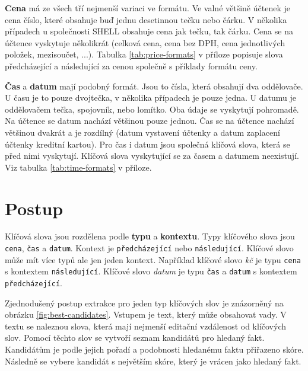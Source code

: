 \documentclass[thesis=B,czech]{FITthesis}[2019/12/23]
\def\myit#1{\texttt{#1}}
\def\pred{\texttt{předcházející}}
\def\po{\texttt{následující}}
\begin{document}
\textbf{Cena} má ze všech tří nejmenší variaci ve formátu. Ve valné většině účtenek je cena číslo, které obsahuje buď jednu desetinnou tečku nebo čárku. V několika případech u společnosti SHELL obsahuje cena jak tečku, tak čárku. Cena se na účtence vyskytuje několikrát (celková cena, cena bez DPH, cena jednotlivých položek, mezisoučet, ...). Tabulka \ref{tab:price-formats} v příloze popisuje slova předcházející a následující za cenou společně s příklady formátu ceny.

\textbf{Čas} a \textbf{datum} mají podobný formát. Jsou to čísla, která obsahují dva oddělovače. U času je to pouze dvojtečka, v několika případech je pouze jedna. U datumu je oddělovačem tečka, spojovník, nebo lomítko. Oba údaje se vyskytují pohromadě. Na účtence se datum nachází většinou pouze jednou. Čas se na účtence nachází většinou dvakrát a je rozdílný (datum vystavení účtenky a datum zaplacení účtenky kreditní kartou). Pro čas i datum jsou společná klíčová slova, která se před nimi vyskytují. Klíčová slova vyskytující se za časem a datumem neexistují. Viz tabulka \ref{tab:time-formats} v příloze.

\section{Postup}
\label{sec:postup}
Klíčová slova jsou rozdělena podle \textbf{typu} a \textbf{kontextu}. Typy klíčového slova jsou \myit{cena}, \myit{čas} a \myit{datum}. Kontext je \pred{} nebo \po{}. Klíčové slovo může mít více typů ale jen jeden kontext. Například klíčové slovo \textit{kč} je typu \myit{cena} s kontextem \po{}. Klíčové slovo \textit{datum} je typu \myit{čas} a \myit{datum} s kontextem \pred{}.

Zjednodušený postup extrakce pro jeden typ klíčových slov je znázorněný na obrázku \ref{fig:best-candidates}. Vstupem je text, který může obsahovat vady. V textu se naleznou slova, která mají nejmenší editační vzdálenost od klíčových slov. Pomocí těchto slov se vytvoří seznam kandidátů pro hledaný fakt. Kandidátům je podle jejich pořadí a podobnosti hledanému faktu přiřazeno skóre. Následně se vybere kandidát s největším skóre, který je vrácen jako hledaný fakt.

\end{document}
